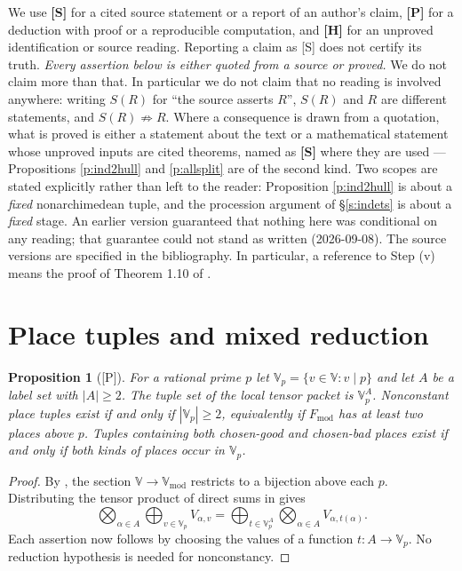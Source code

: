 \documentclass[11pt]{article}
\theoremstyle{plain}
\newtheorem{proposition}{Proposition}
\theoremstyle{definition}
\newcommand{\Fmod}{F_{\mathrm{mod}}}
\newcommand{\Vmod}{\mathbb{V}_{\mathrm{mod}}}
\newcommand{\VV}{\mathbb{V}}
\begin{document}
We use \textbf{[S]} for a cited source statement or a report of an author's
claim, \textbf{[P]} for a deduction with proof or a reproducible computation,
and \textbf{[H]} for an unproved identification or source reading.
Reporting a claim as [S] does not certify its truth.
\emph{Every assertion below is either quoted from a source or proved.}  We do not
claim more than that.  In particular we do not claim that no reading is involved
anywhere: writing $S(R)$ for ``the source asserts $R$'', $S(R)$ and $R$ are different
statements, and $S(R)\not\Rightarrow R$.  Where a consequence is drawn from a
quotation, what is proved is either a statement about the text or a mathematical
statement whose unproved inputs are cited theorems, named as \textbf{[S]} where they
are used --- Propositions \ref{p:ind2hull} and \ref{p:allsplit} are of the second kind.
Two scopes are stated
explicitly rather than left to the reader: Proposition \ref{p:ind2hull} is about a
\emph{fixed} nonarchimedean tuple, and the procession argument of \S\ref{s:indets} is
about a \emph{fixed} stage.  An earlier version guaranteed that nothing here was
conditional on any reading; that guarantee could not
stand as written (2026-09-08).
The source versions are specified in the bibliography.  In particular, a
reference to Step (v) means the proof of Theorem 1.10 of \cite{IUT4}.



\section{Place tuples and mixed reduction}\label{s:mech}

\begin{proposition}[\textup{[P]}]\label{p:dichotomy}
For a rational prime $p$ let $\VV_p=\{v\in\VV:v\mid p\}$ and let $A$ be a
label set with $|A|\ge2$.  The tuple set of the local tensor packet is
$\VV_p^A$.  Nonconstant place tuples exist if and only if $|\VV_p|\ge2$,
equivalently if $\Fmod$ has at least two places above $p$.
Tuples containing both chosen-good and chosen-bad places exist if and only
if both kinds of places occur in $\VV_p$.
\end{proposition}

\begin{proof}
By \cite[Definition 3.1(e)]{IUT1}, the section $\VV\to\Vmod$ restricts to a
bijection above each $p$.  Distributing the tensor product of direct sums in
\cite[Propositions 3.1, 3.2]{IUT3} gives
\[
 \bigotimes_{\alpha\in A}\bigoplus_{v\in\VV_p}V_{\alpha,v}
 =\bigoplus_{t\in\VV_p^A}\bigotimes_{\alpha\in A}V_{\alpha,t(\alpha)}.
\]
Each assertion now follows by choosing the values of a function $t:A\to\VV_p$.
No reduction hypothesis is needed for nonconstancy.
\end{proof}
\end{document}
